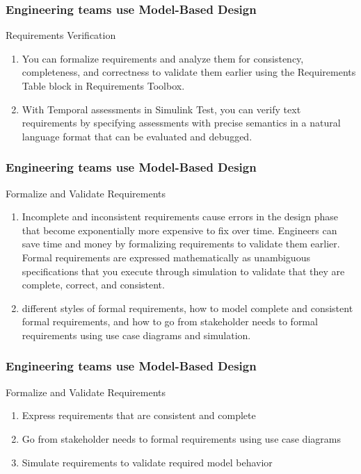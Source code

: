 \newpage 

\begin{frame}
\frametitle{Engineering teams use Model-Based Design }
\begin{block}{ Requirements Verification}

\begin{enumerate}
    \item You can formalize requirements and analyze them for consistency, completeness, and correctness to validate them earlier using the Requirements Table block in Requirements Toolbox. 
 \item  With Temporal assessments in Simulink Test, you can verify text requirements by specifying assessments with precise semantics in a natural language format that can be evaluated and debugged.
\end{enumerate}

\end{block}
\end{frame}

\newpage 

\begin{frame}
\frametitle{Engineering teams use Model-Based Design }
\begin{block}{ Formalize and Validate Requirements}

\begin{enumerate}
    \item Incomplete and inconsistent requirements cause errors in the design phase that become exponentially more expensive to fix over time. Engineers can save time and money by formalizing requirements to validate them earlier. Formal requirements are expressed mathematically as unambiguous specifications that you execute through simulation to validate that they are complete, correct, and consistent.
 \item  different styles of formal requirements, how to model complete and consistent formal requirements, and how to go from stakeholder needs to formal requirements using use case diagrams and simulation.


\end{enumerate}

\end{block}
\end{frame}

\newpage 

\begin{frame}
\frametitle{Engineering teams use Model-Based Design }
\begin{block}{ Formalize and Validate Requirements}

\begin{enumerate}
    \item  Express requirements that are consistent and complete
 \item   Go from stakeholder needs to formal requirements using use case diagrams
  \item Simulate requirements to validate required model behavior 
\end{enumerate}

\end{block}
\end{frame}


